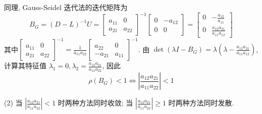 \begin{tcolorbox}
同理, Gauss-Seidel 迭代法的迭代矩阵为  
$$
B_{G}=(D-L)^{-1}U=\left[\begin{array}{cc}
a_{11} & 0 \\
a_{21} & a_{22}
\end{array}\right]^{-1}\left[\begin{array}{cc}
0 & -a_{12} \\
0 & 0
\end{array}\right]=\left[\begin{array}{cc}
0 & -\frac{a_{12}}{a_{11}} \\
0 & \frac{a_{12} a_{21}}{a_{11} a_{12}}
\end{array}\right]
$$
其中$\left[\begin{array}{cc}
a_{11} & 0 \\
a_{21} & a_{22}
\end{array}\right]^{-1}=\frac{1}{a_{11}a_{22}}\left[\begin{array}{cc}
a_{22} & 0 \\
-a_{21} & a_{11}
\end{array}\right]^{-1}$. 由 $ \operatorname{det}\left(\lambda I-B_{G}\right)=\lambda\left(\lambda-\frac{a_{12} a_{21}}{a_{11} a_{12}}\right) $, 计算其特征值 $ \lambda_{1}=0, \lambda_{2}=\frac{a_{12} a_{21}}{a_{11} a_{22}} $, 因此
$$
\rho\left(B_{G}\right)<1\iff \left|\frac{a_{12} a_{21}}{a_{11} a_{22}}\right|<1
$$

(2) 当 $|\frac{a_{12} a_{21}}{a_{11} a_{22}}|<1$ 时两种方法同时收敛; 当 $|\frac{a_{12} a_{21}}{a_{11} a_{22}}| \geqslant 1$ 时两种方法同时发散.
\end{tcolorbox}

